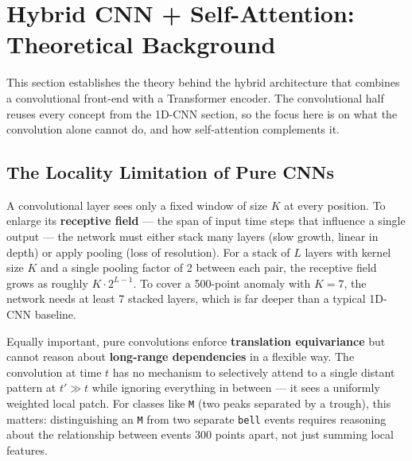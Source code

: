 \section{Hybrid CNN + Self-Attention: Theoretical Background}
This section establishes the theory behind the hybrid architecture that combines a convolutional front-end with a Transformer encoder. The convolutional half reuses every concept from the 1D-CNN section, so the focus here is on what the convolution alone cannot do, and how self-attention complements it.

\subsection{The Locality Limitation of Pure CNNs}
A convolutional layer sees only a fixed window of size $K$ at every position. To enlarge its \textbf{receptive field} --- the span of input time steps that influence a single output --- the network must either stack many layers (slow growth, linear in depth) or apply pooling (loss of resolution). For a stack of $L$ layers with kernel size $K$ and a single pooling factor of 2 between each pair, the receptive field grows as roughly $K \cdot 2^{L-1}$. To cover a 500-point anomaly with $K = 7$, the network needs at least 7 stacked layers, which is far deeper than a typical 1D-CNN baseline.

Equally important, pure convolutions enforce \textbf{translation equivariance} but cannot reason about \textbf{long-range dependencies} in a flexible way. The convolution at time $t$ has no mechanism to selectively attend to a single distant pattern at $t' \gg t$ while ignoring everything in between --- it sees a uniformly weighted local patch. For classes like \texttt{M} (two peaks separated by a trough), this matters: distinguishing an \texttt{M} from two separate \texttt{bell} events requires reasoning about the relationship between events 300 points apart, not just summing local features.

